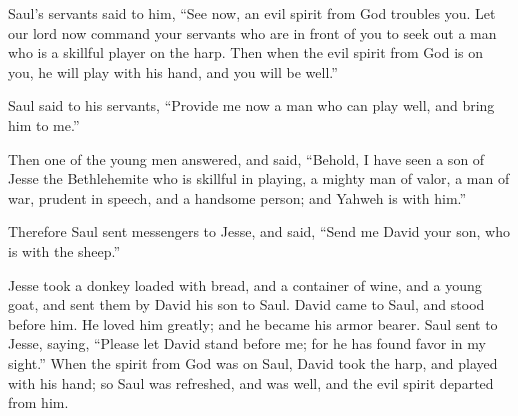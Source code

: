 {Saul’s servants said to him, “See now, an evil spirit from God troubles you.
Let our lord now command your servants who are in front of you to seek out a man who is a skillful player on the harp. Then when the evil spirit from God is on you, he will play with his hand, and you will be well.”
\par }{\PP {}Saul said to his servants, “Provide me now a man who can play well, and bring him to me.”
\par }{\PP {}Then one of the young men answered, and said, “Behold, I have seen a son of Jesse the Bethlehemite who is skillful in playing, a mighty man of valor, a man of war, prudent in speech, and a handsome person; and Yahweh is with him.”
\par }{\PP {}Therefore Saul sent messengers to Jesse, and said, “Send me David your son, who is with the sheep.”
\par }{\PP {}Jesse took a donkey loaded with bread, and a container of wine, and a young goat, and sent them by David his son to Saul.
David came to Saul, and stood before him. He loved him greatly; and he became his armor bearer.
Saul sent to Jesse, saying, “Please let David stand before me; for he has found favor in my sight.”
When the spirit from God was on Saul, David took the harp, and played with his hand; so Saul was refreshed, and was well, and the evil spirit departed from him.

}
